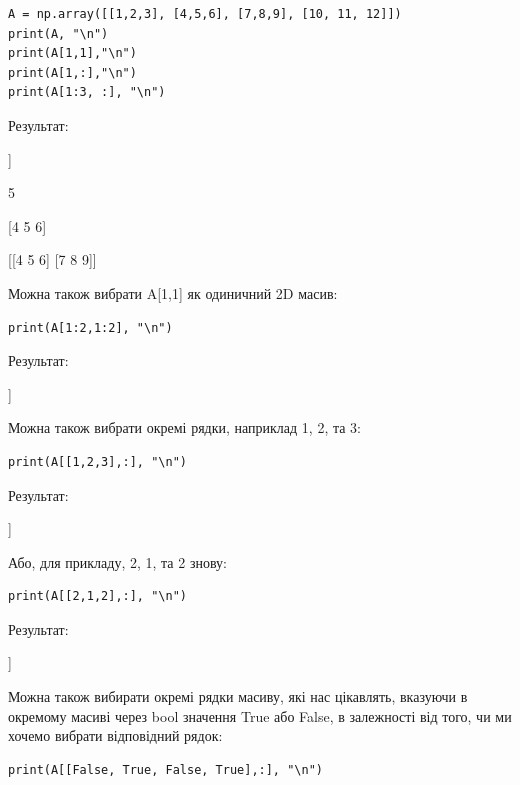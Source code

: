 \begin{lstlisting}
A = np.array([[1,2,3], [4,5,6], [7,8,9], [10, 11, 12]])
print(A, "\n")
print(A[1,1],"\n")        
print(A[1,:],"\n")          
print(A[1:3, :], "\n")      
\end{lstlisting}

Результат:

\begin{console}
[[ 1  2  3]
 [ 4  5  6]
 [ 7  8  9]
 [10 11 12]] 

5 

[4 5 6] 

[[4 5 6]
 [7 8 9]] 
\end{console}

Можна також вибрати A[1,1] як одиничний 2D масив:

\begin{lstlisting}
print(A[1:2,1:2], "\n")
\end{lstlisting}

Результат:

\begin{console}
[[5]] 
\end{console}

Можна також вибрати окремі рядки, наприклад 1, 2, та 3:

\begin{lstlisting}
print(A[[1,2,3],:], "\n")
\end{lstlisting}

Результат:

\begin{console}
[[ 4  5  6]
 [ 7  8  9]
 [10 11 12]] 
\end{console}

Або, для прикладу, 2, 1, та 2 знову:

\begin{lstlisting}
print(A[[2,1,2],:], "\n")
\end{lstlisting}

Результат:

\begin{console}
[[7 8 9]
 [4 5 6]
 [7 8 9]] 
\end{console}

Можна також вибирати окремі рядки масиву, які нас цікавлять, вказуючи в окремому масиві через bool значення True або False, в залежності від того, чи ми хочемо вибрати відповідний рядок:

\begin{lstlisting}
print(A[[False, True, False, True],:], "\n")
\end{lstlisting}

